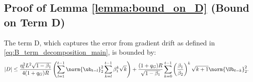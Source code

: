 \documentclass[11pt, letterpaper]{article}
\begin{document}
\subsection{Proof of Lemma \ref{lemma:bound_on_D} (Bound on Term D)}
\begin{lemma}
\label{lemma:bound_on_D}
The term D, which captures the error from gradient drift as defined in \eqref{eq:B_term_decomposition_main}, is bounded by:
\begin{align}
|D| \leq \frac{\eta_t^2 L^2 \sqrt{1 - \beta_1}}{4 (1+q_G)R}\left( \sum_{l=1}^{t-1}\norm{\ub_{t-l}}_2^2\sum_{k=l}^{t - 1}\beta_1^k \sqrt{k} \right)
+\frac{(1+q_G)R}{\sqrt{1 - \beta_1}} \sum_{k=0}^{t-1} \left(\frac{\beta_1}{\beta_2}\right)^k \sqrt{k+1}\norm{\Ub_{t-k}}_2^2.
\end{align}
\end{lemma}
\end{document}
